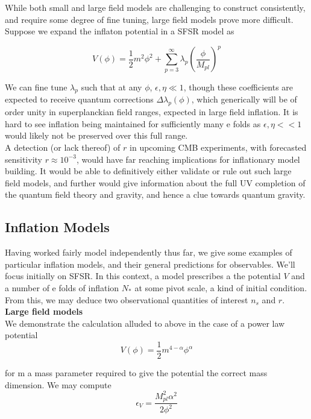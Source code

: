\documentclass[a4paper,10pt]{article}
\newcommand{\Mp}{M_{pl}}
\newcommand{\half}{\frac{1}{2}}
\begin{document}
While both small and large field models are challenging to construct consistently, and require some degree of fine tuning, large field models prove more difficult. Suppose we expand the inflaton potential in a SFSR model as 

\begin{equation}
V(\phi) = \half m^2\phi^2 + \sum_{p=3}^\infty \lambda_p(\frac{\phi}{\Mp})^p
\end{equation}

We can fine tune $\lambda_p$ such that at any $\phi$, $\epsilon, \eta \ll 1$, though these coefficients are expected to receive quantum corrections $\Delta\lambda_p(\phi)$, which generically will be of order unity in superplanckian field ranges, expected in large field inflation. It is hard to see inflation being maintained for sufficiently many e folds as $\epsilon, \eta << 1$ would likely not be preserved over this full range. \\

A detection (or lack thereof) of $r$ in upcoming CMB experiments, with forecasted sensitivity $r\approx 10^{-3}$, would have far reaching implications for inflationary model building. It would be able to definitively either validate or rule out such large field models, and further would give information about the full UV completion of the quantum field theory and gravity, and hence a clue towards quantum gravity.

\subsection{Inflation Models}

Having worked fairly model independently thus far, we give some examples of particular inflation models, and their general predictions for observables. We'll focus initially on SFSR. In this context, a model prescribes a the potential $V$ and a number of e folds of inflation $N_*$ at some pivot scale, a kind of initial condition. From this, we may deduce two observational quantities of interest $n_s$ and $r$. \\

\textbf{Large field models} \\

We demonstrate the calculation alluded to above in the case of a power law potential \cite{QBM}
\begin{equation}
V(\phi) = \half m^{4-\alpha}\phi^\alpha
\end{equation}

for m a mass parameter required to give the potential the correct mass dimension. We may compute 
\begin{equation}
\epsilon_V = \frac{\Mp^2\alpha^2}{2\phi^2}
\end{equation}
	
\end{document}
